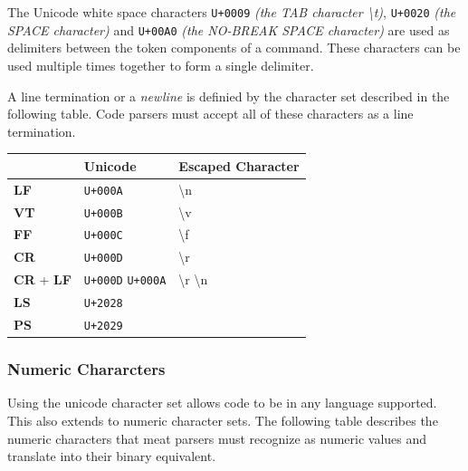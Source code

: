 \documentclass [10pt]{article}
\begin{document}
The Unicode white space characters \texttt{U+0009}
\textit{(the TAB character \textbackslash t)}, \texttt{U+0020}
\textit{(the SPACE character)} and
\texttt{U+00A0} \textit{(the NO-BREAK SPACE character)} are used as delimiters
between the token components of a command. These characters can be used
multiple times together to form a single delimiter.

A line termination or a \textit{newline} is definied by the character set
described in the following table. Code parsers must accept all of these
characters as a line termination.

\begin{center}
  \begin{tabular}{|l|l|l|}
    \hline
    & \textbf{Unicode} & \textbf{Escaped Character} \\ \hline
    \textbf{LF} & \texttt{U+000A} & \textbackslash n \\ \hline
    \textbf{VT} & \texttt{U+000B} & \textbackslash v \\ \hline
    \textbf{FF} & \texttt{U+000C} & \textbackslash f \\ \hline
    \textbf{CR} & \texttt{U+000D} & \textbackslash r \\ \hline
    \textbf{CR} + \textbf{LF} & \texttt{U+000D} \texttt{U+000A} &
    \textbackslash r \textbackslash n \\ \hline
    \textbf{LS} & \texttt{U+2028} & \\ \hline
    \textbf{PS} & \texttt{U+2029} & \\ \hline
  \end{tabular}
\end{center}

\subsubsection {Numeric Chararcters}

Using the unicode character set allows code to be in any language supported.
This also extends to numeric character sets. The following table describes the
numeric characters that meat parsers must recognize as numeric values and
translate into their binary equivalent.
\end{document}

